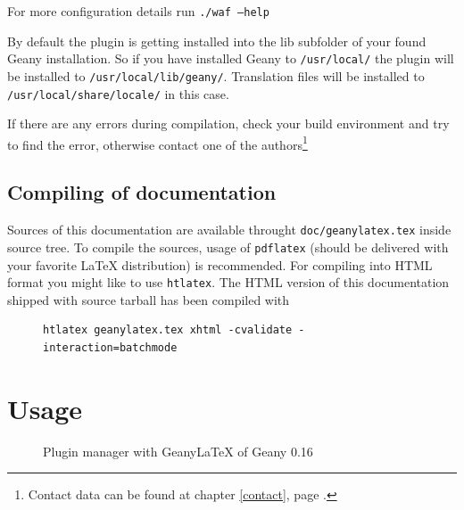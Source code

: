 \documentclass[%
paper=a4,%
fontsize=11pt,%
twoside=false,%
DIV18,
headsepline,
plainheadsepline,
footsepline,
plainfootsepline,
bibliography=totoc,%
listof=totoc,%
BCOR10mm,%
parskip=half,%
openany,%
]{scrartcl}
\begin{document}
For more configuration details run \texttt{./waf --help}

By default the plugin is getting installed into the lib subfolder of
your found Geany installation. So if you have installed Geany to
\texttt{/usr/local/} the plugin will be installed to
\texttt{/usr/local/lib/geany/}. Translation files will be installed to
\texttt{/usr/local/share/locale/} in this case.

If there are any errors during compilation, check your build environment
and try to find the error, otherwise contact one of the
authors\footnote{Contact data can be found at chapter \ref{contact},
page \pageref{contact}.}

\subsection{Compiling of documentation}
\label{sec:compiling_of_documentation}
Sources of this documentation are available throught
\texttt{doc/geanylatex.tex} inside source tree. To compile the sources,
usage of \texttt{pdflatex} (should be delivered with your favorite
\LaTeX{} distribution) is recommended. For compiling into HTML format you
might like to use \texttt{htlatex}. The HTML version of this documentation
shipped with source tarball has been compiled with

\begin{figure}[h!]
\begin{lstlisting}
htlatex geanylatex.tex xhtml -cvalidate -interaction=batchmode
\end{lstlisting}
\end{figure}

\section{Usage}
\begin{figure}[h!]
	\caption{Plugin manager with Geany\LaTeX{} of Geany 0.16}
\end{figure}
\end{document}
